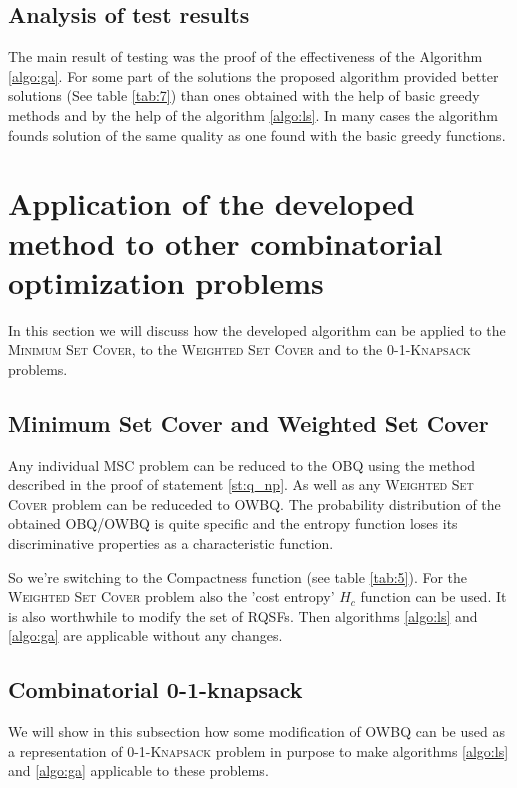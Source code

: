 \documentclass[11pt]{article}
\begin{document}
%
%
%
\subsection{Analysis of test results}
The main result of testing was the proof of the effectiveness of the Algorithm \ref{algo:ga}. For some part of the solutions the proposed algorithm provided better solutions (See table \ref{tab:7}) than ones obtained with the help of basic greedy methods and by the help of the algorithm \ref{algo:ls}. In many cases the algorithm founds solution of the same quality as one found with the basic greedy functions.

%
%
%
%
%
%
%
\section{Application of the developed method to other combinatorial optimization problems}
In this section we will discuss how the developed algorithm can be applied to the \textsc{Minimum Set Cover}, to the \textsc{Weighted Set Cover} and to the \textsc{0-1-Knapsack} problems.

%
%
%
\subsection{Minimum Set Cover and Weighted Set Cover}
Any individual MSC problem can be reduced to the OBQ using the method described in the proof of statement \ref{st:q_np}. As well as any \textsc{Weighted Set Cover} problem can be reduceded to OWBQ. The probability distribution of the obtained OBQ/OWBQ is quite specific and the entropy function loses its discriminative properties as a characteristic function. 

So we're switching to the Compactness function (see table \ref{tab:5}). For the \textsc{Weighted Set Cover} problem also the 'cost entropy' $H_c$ function can be used. It is also worthwhile to modify the set of RQSFs. Then algorithms \ref{algo:ls} and \ref{algo:ga} are applicable without any changes. 

%
%
%
\subsection{Combinatorial 0-1-knapsack}
We will show in this subsection how some modification of OWBQ can be used as a representation of \textsc{0-1-Knapsack} problem in purpose to make algorithms \ref{algo:ls} and \ref{algo:ga} applicable to these problems.
\end{document}
